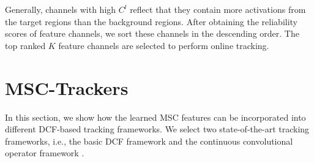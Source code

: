 \documentclass[runningheads]{llncs}
\begin{document}

Generally, channels with high $C^l$ reflect that they contain more activations from the target regions than the background regions. After obtaining the reliability scores of feature channels, we sort these channels in the descending order. The top ranked $K$ feature channels are selected to perform online tracking. 




\section{MSC-Trackers}
In this section, we show how the learned MSC features can be incorporated into different DCF-based tracking frameworks. We select two state-of-the-art tracking frameworks, i.e., the basic DCF framework \cite{KCF} and the continuous convolutional operator framework \cite{CCOT}.   
\end{document}
